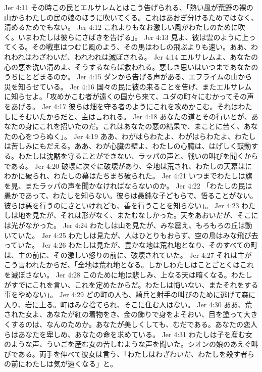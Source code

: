 Jer 4:11  その時この民とエルサレムとはこう告げられる、「熱い風が荒野の裸の山からわたしの民の娘のほうに吹いてくる。これはあおぎ分けるためではなく、清めるためでもない。
Jer 4:12  これよりもなお激しい風がわたしのために吹く。いまわたしは彼らにさばきを告げる」。
Jer 4:13  見よ、彼は雲のように上ってくる。その戦車はつむじ風のよう、その馬はわしの飛ぶよりも速い。ああ、われわれはわざわいだ、われわれは滅ぼされる。
Jer 4:14  エルサレムよ、あなたの心の悪を洗い清めよ、そうするならば救われる。悪しき思いはいつまであなたのうちにとどまるのか。
Jer 4:15  ダンから告げる声がある、エフライムの山から災を知らせている。
Jer 4:16  国々の民に彼の来ることを告げ、またエルサレムに知らせよ。「攻めかこむ者が遠くの国から来て、ユダの町々にむかってその声をあげる。
Jer 4:17  彼らは畑を守る者のようにこれを攻めかこむ。それはわたしにそむいたからだと、主は言われる。
Jer 4:18  あなたの道とその行いとが、あなたの身にこれを招いたのだ。これはあなたの悪の結果で、まことに苦く、あなたの心をつらぬく」。
Jer 4:19  ああ、わがはらわたよ、わがはらわたよ、わたしは苦しみにもだえる。ああ、わが心臓の壁よ、わたしの心臓は、はげしく鼓動する。わたしは沈黙を守ることができない、ラッパの声と、戦いの叫びを聞くからである。
Jer 4:20  破壊に次ぐに破壊があり、全地は荒され、わたしの天幕はにわかに破られ、わたしの幕はたちまち破られた。
Jer 4:21  いつまでわたしは旗を見、またラッパの声を聞かなければならないのか。
Jer 4:22  「わたしの民は愚かであって、わたしを知らない。彼らは愚鈍な子どもらで、悟ることがない。彼らは悪を行うのにさといけれども、善を行うことを知らない」。
Jer 4:23  わたしは地を見たが、それは形がなく、またむなしかった。天をあおいだが、そこには光がなかった。
Jer 4:24  わたしは山を見たが、みな震え、もろもろの丘は動いていた。
Jer 4:25  わたしは見たが、人はひとりもおらず、空の鳥はみな飛び去っていた。
Jer 4:26  わたしは見たが、豊かな地は荒れ地となり、そのすべての町は、主の前に、その激しい怒りの前に、破壊されていた。
Jer 4:27  それは主がこう言われたからだ、「全地は荒れ地となる。しかしわたしはことごとくはこれを滅ぼさない。
Jer 4:28  このために地は悲しみ、上なる天は暗くなる。わたしがすでにこれを言い、これを定めたからだ。わたしは悔いない、またそれをする事をやめない」。
Jer 4:29  どの町の人も、騎兵と射手の叫びのために逃げて森に入り、岩に上る。町はみな捨てられ、そこに住む人はない。
Jer 4:30  ああ、荒された女よ、あなたが紅の着物をき、金の飾りで身をよそおい、目を塗って大きくするのは、なんのためか。あなたが美しくしても、むだである。あなたの恋人らはあなたを卑しめ、あなたの命を求めている。
Jer 4:31  わたしは子を産む女のような声、ういごを産む女の苦しむような声を聞いた。シオンの娘のあえぐ叫びである。両手を伸べて彼女は言う、「わたしはわざわいだ、わたしを殺す者らの前にわたしは気が遠くなる」と。
